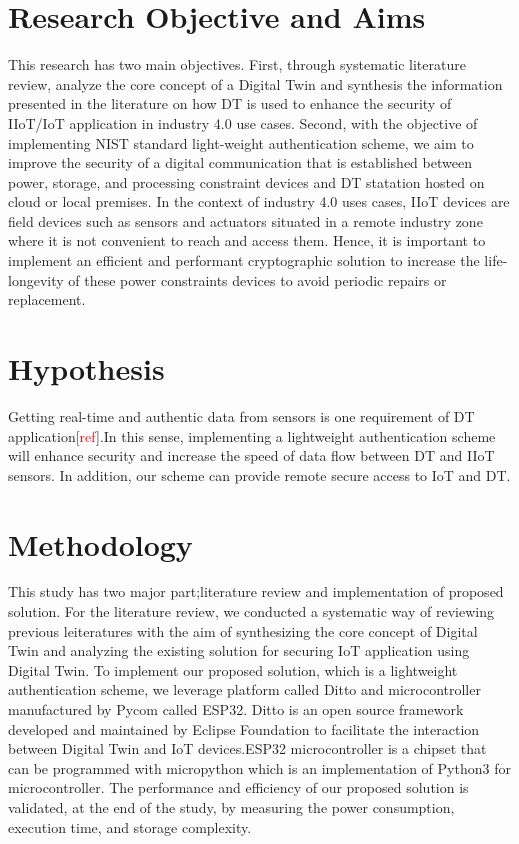 \section{Research Objective and Aims}
This research has two main objectives. First, through systematic literature review, analyze the core concept of a Digital Twin and synthesis the information presented in the literature on how DT is used to enhance the security of IIoT/IoT application in industry 4.0 use cases. Second, with the objective of implementing NIST standard light-weight authentication scheme, we aim to improve the security of a digital communication that is established between power, storage, and processing constraint devices and DT statation hosted on cloud or local premises. In the context of industry 4.0 uses cases,  IIoT devices are field devices such as sensors and actuators situated in a remote industry zone where it is not convenient to reach and access them. Hence, it is important to implement an efficient and performant cryptographic solution to increase the life-longevity of these power constraints devices to avoid periodic repairs or replacement.  

\section{Hypothesis}
Getting real-time and authentic data from sensors is one requirement of DT application[\textcolor{red}{ref}].In this sense, implementing a lightweight authentication scheme will enhance security and increase the speed of data flow between DT and IIoT sensors. In addition, our scheme can provide remote secure access to IoT and DT.  


\section{Methodology}
This study has two major part;literature review and implementation of proposed solution. For the literature review, we conducted a systematic way of reviewing previous leiteratures with the aim of synthesizing the core concept of Digital Twin and analyzing the existing solution for securing IoT application using Digital Twin. To implement our proposed solution, which is a lightweight authentication scheme, we leverage platform called Ditto and microcontroller manufactured by Pycom called ESP32. Ditto is an open source framework developed and maintained by Eclipse Foundation to facilitate the interaction between Digital Twin and IoT devices\cite{noauthor_eclipse_nodate}.ESP32 microcontroller is a chipset that can be programmed with micropython which is an implementation of Python3 for microcontroller. 
The performance and efficiency of our proposed solution is validated, at the end of the study, by measuring the power consumption, execution time, and storage complexity. 

